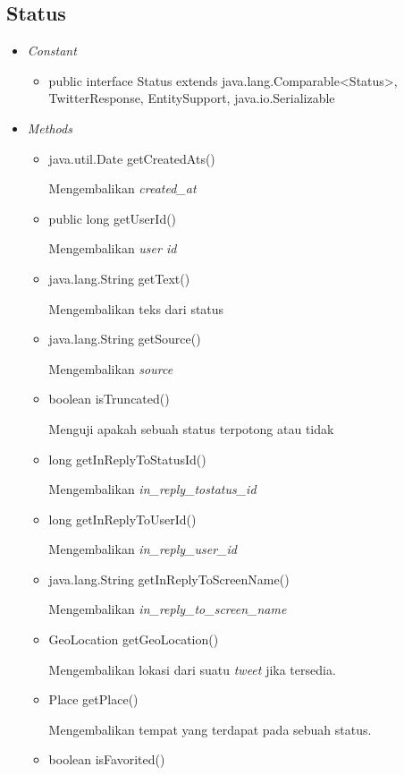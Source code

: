 	\subsection{Status}
	\begin{itemize}
		\item \textit{Constant}
		
		\begin{itemize}
			\item public interface Status
			extends java.lang.Comparable<Status>, TwitterResponse, EntitySupport, java.io.Serializable
						
		\end{itemize}
		\item \textit{Methods}
		
		\begin{itemize}
			\item java.util.Date getCreatedAts()
			
			Mengembalikan \textit{created\_at}
			\item public long getUserId()
			
			Mengembalikan \textit{user id}
			\item java.lang.String getText()
			
			Mengembalikan teks dari status
			\item java.lang.String getSource()
			
			Mengembalikan \textit{source}
			\item boolean isTruncated()
			
			Menguji apakah sebuah status terpotong atau tidak
			\item long getInReplyToStatusId()
			
			Mengembalikan \textit{in\_reply\_tostatus\_id}
			\item long getInReplyToUserId()
			
			Mengembalikan \textit{in\_reply\_user\_id}
			\item java.lang.String getInReplyToScreenName()
			
			Mengembalikan \textit{in\_reply\_to\_screen\_name}
			\item GeoLocation getGeoLocation()
			
			Mengembalikan lokasi dari suatu \textit{tweet} jika tersedia.
			\item Place getPlace()
			
			Mengembalikan tempat yang terdapat pada sebuah status.
			\item boolean isFavorited()
			

\end{itemize}
\end{itemize}
